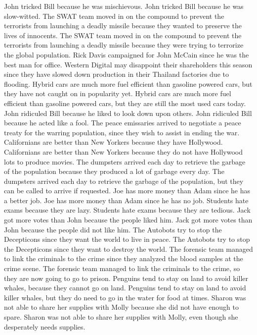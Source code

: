 \documentclass{article}
\begin{document}
\begin{enumerate}
John tricked Bill because he was mischievous.
John tricked Bill because he was slow-witted.
The SWAT team moved in on the compound to prevent the terrorists from launching a deadly missile because they wanted to preserve the lives of innocents.
The SWAT team moved in on the compound to prevent the terrorists from launching a deadly missile because they were trying to terrorize the global population.
Rick Davis campaigned for John McCain since he was the best man for office.
Western Digital may disappoint their shareholders this season since they have slowed down production in their Thailand factories due to flooding.
Hybrid cars are much more fuel efficient than gasoline powered cars, but they have not caught on in popularity yet.
Hybrid cars are much more fuel efficient than gasoline powered cars, but they are still the most used cars today.
John ridiculed Bill because he liked to look down upon others.
John ridiculed Bill because he acted like a fool.
The peace emissaries arrived to negotiate a peace treaty for the warring population, since they wish to assist in ending the war.
Californians are better than New Yorkers because they have Hollywood.
Californians are better than New Yorkers because they do not have Hollywood lots to produce movies.
The dumpsters arrived each day to retrieve the garbage of the population because they produced a lot of garbage every day.
The dumpsters arrived each day to retrieve the garbage of the population, but they can be called to arrive if requested.
Joe has more money than Adam since he has a better job.
Joe has more money than Adam since he has no job.
Students hate exams because they are lazy.
Students hate exams because they are tedious.
Jack got more votes than John because the people liked him.
Jack got more votes than John because the people did not like him.
The Autobots try to stop the Decepticons since they want the world to live in peace.
The Autobots try to stop the Decepticons since they want to destroy the world.
The forensic team managed to link the criminals to the crime since they analyzed the blood samples at the crime scene.
The forensic team managed to link the criminals to the crime, so they are now going to go to prison.
Penguins tend to stay on land to avoid killer whales, because they cannot go on land.
Penguins tend to stay on land to avoid killer whales, but they do need to go in the water for food at times.
Sharon was not able to share her supplies with Molly because she did not have enough to spare.
Sharon was not able to share her supplies with Molly, even though she desperately needs supplies.

\end{enumerate}
\end{document}
